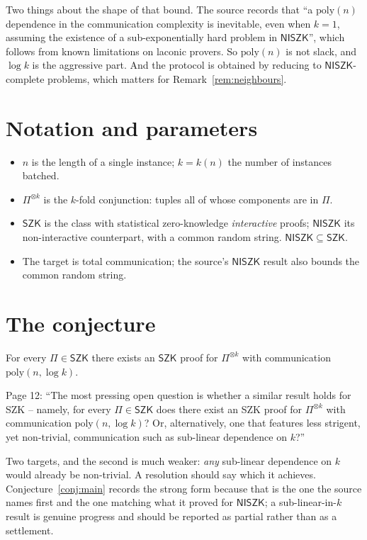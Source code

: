\documentclass{aicr-conjecture}
\newcommand{\NISZK}{\mathsf{NISZK}}
\newcommand{\SZK}{\mathsf{SZK}}
\begin{document}
Two things about the shape of that bound. The source records that ``a
$\mathrm{poly}(n)$ dependence in the communication complexity is
inevitable, even when $k = 1$, assuming the existence of a
sub-exponentially hard problem in $\NISZK$'', which follows from known
limitations on laconic provers. So $\mathrm{poly}(n)$ is not slack, and
$\log k$ is the aggressive part. And the protocol is obtained by reducing
to $\NISZK$-complete problems, which matters for
Remark~\ref{rem:neighbours}.

\section{Notation and parameters}\label{sec:notation}

\begin{itemize}[nosep]
  \item $n$ is the length of a single instance; $k = k(n)$ the number of
    instances batched.
  \item $\Pi^{\otimes k}$ is the $k$-fold conjunction: tuples all of
    whose components are in $\Pi$.
  \item $\SZK$ is the class with statistical zero-knowledge
    \emph{interactive} proofs; $\NISZK$ its non-interactive counterpart,
    with a common random string. $\NISZK \subseteq \SZK$.
  \item The target is total communication; the source's $\NISZK$ result
    also bounds the common random string.
\end{itemize}

\section{The conjecture}\label{sec:conjectures}

\begin{conjecture}\label{conj:main}
For every $\Pi \in \SZK$ there exists an $\SZK$ proof for
$\Pi^{\otimes k}$ with communication $\mathrm{poly}(n, \log k)$.
\end{conjecture}

\begin{remark}\label{rem:framing}
Page 12: ``The most pressing open question is whether a similar result
holds for SZK -- namely, for every $\Pi \in \SZK$ does there exist an SZK
proof for $\Pi^{\otimes k}$ with communication $\mathrm{poly}(n, \log
k)$? Or, alternatively, one that features less strigent, yet non-trivial,
communication such as sub-linear dependence on $k$?''

Two targets, and the second is much weaker: \emph{any} sub-linear
dependence on $k$ would already be non-trivial. A resolution should say
which it achieves. Conjecture~\ref{conj:main} records the strong form
because that is the one the source names first and the one matching what
it proved for $\NISZK$; a sub-linear-in-$k$ result is genuine progress
and should be reported as partial rather than as a settlement.
\end{remark}
\end{document}
